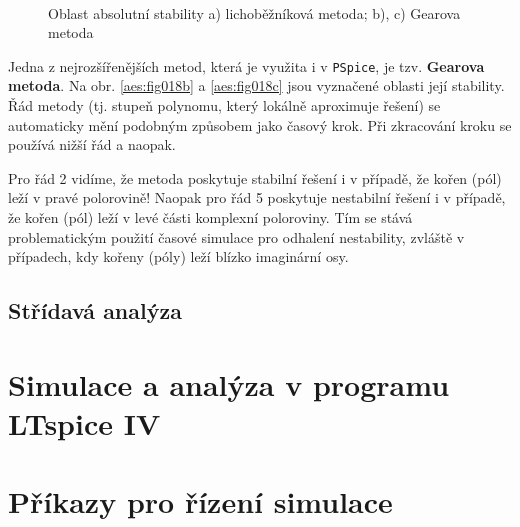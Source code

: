         \begin{figure}[ht!]
          \centering  
              \hspace{1em}            
              \\            
          \caption{Oblast absolutní stability a) lichoběžníková metoda; b), c) Gearova metoda}
          \label{aes:fig018}
        \end{figure}

        Jedna z nejrozšířenějších metod, která je využita i v \texttt{PSpice}, je tzv.
        \textbf{Gearova metoda}. Na obr. \ref{aes:fig018b} a \ref{aes:fig018c} jsou
        vyznačené oblasti její stability. Řád metody (tj. stupeň polynomu, který lokálně aproximuje
        řešení) se automaticky mění podobným způsobem jako časový krok. Při zkracování kroku se
        používá nižší řád a naopak.

        Pro řád \num{2} vidíme, že metoda poskytuje stabilní řešení i v případě, že kořen (pól) leží
        v pravé polorovině! Naopak pro řád \num{5} poskytuje nestabilní řešení i v případě, že kořen
        (pól) leží v levé části komplexní poloroviny. Tím se stává problematickým použití časové
        simulace pro odhalení nestability, zvláště v případech, kdy kořeny (póly) leží blízko
        imaginární osy.

        \subsection{Střídavá analýza}



        
  \section{Simulace a analýza v programu LTspice IV}
   
  \section{Příkazy pro řízení simulace}
    
